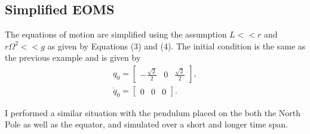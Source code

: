 \documentclass[11pt, reqno]{article}   	%
\begin{document}
\subsection*{Simplified EOMS}

The equations of motion are simplified using the assumption \( L << r \) and \(r \Omega^2 << g \) as given by Equations (3) and (4). 
The initial condition is the same as the previous example and is given by
\begin{align*}
    q_0 = \begin{bmatrix} -\frac{\sqrt{2}}{2} & 0 & \frac{\sqrt{2}}{2} \end{bmatrix} ,\\
    \dot{q}_0 = \begin{bmatrix}0 & 0 & 0 \end{bmatrix}.
\end{align*}

I performed a similar situation with the pendulum placed on the both the North Pole as well as the equator, and simulated over a short and longer time span. 
\end{document}
